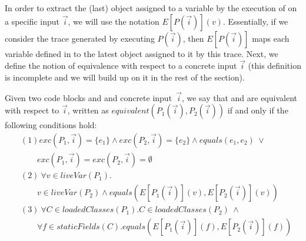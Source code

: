 \documentclass[sigconf,review,anonymous]{acmart}
\begin{document}

In order to extract the (last) object assigned to a variable  by the execution of  on a specific input $\vec{i}$,
we will use the notation $E[P(\vec{i})](v)$. Essentially, if we consider the trace generated by executing $P(\vec{i})$,
then $E[P(\vec{i})]$ maps each variable defined in  to the latest object assigned to it by this trace.
Next, we define the notion of equivalence with respect to a concrete input $\vec{i}$ (this definition is incomplete and we will build up on it in the rest of the section).

\begin{definition}\label{def:prog-equiv}
  Given two code blocks  and  and concrete input~$\vec{i}$,
  we say that  and  are equivalent
  with respect to $\vec{i}$, written as $equivalent(P_1(\vec{i}), P_2(\vec{i}))$
  if and only if the following conditions hold:
%
\[
\begin{aligned}
  & (1) exc(P_1, \vec{i})=\{e_1\} \wedge exc(P_2, \vec{i})=\{e_2\} \wedge equals(e_1,e_2) ~\vee\\
  & \qquad exc(P_1, \vec{i})=exc(P_2, \vec{i}) =\emptyset \\ 
      & (2)~ \forall v\in liveVar(P_1). \\
      & \qquad v\in liveVar(P_2) \wedge equals(E[P_1(\vec{i})](v), E[P_2(\vec{i})](v))\\
& (3)~  \forall C \in loadedClasses(P_1). C \in loadedClasses(P_2)~ \wedge \\
  &  \qquad \forall f {\in} staticFields(C).equals(E[P_1(\vec{i})](f), E[P_2(\vec{i})](f))
    \end{aligned}
    \]
   
  \end{definition}
\end{document}
